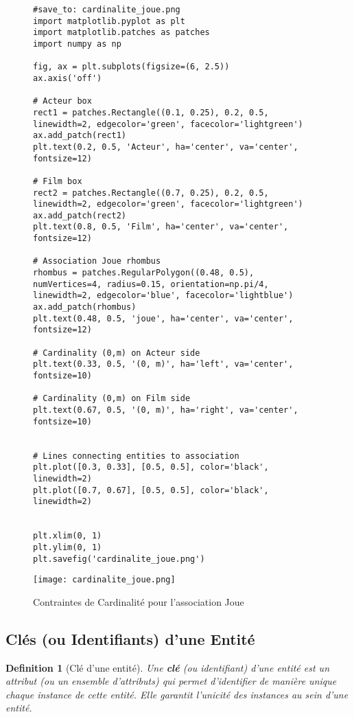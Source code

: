 \documentclass{article}
\newtheorem{definition}{Definition}
\begin{document}
\begin{figure}[H]
    \centering
    \begin{verbatim}
#save_to: cardinalite_joue.png
import matplotlib.pyplot as plt
import matplotlib.patches as patches
import numpy as np

fig, ax = plt.subplots(figsize=(6, 2.5))
ax.axis('off')

# Acteur box
rect1 = patches.Rectangle((0.1, 0.25), 0.2, 0.5, linewidth=2, edgecolor='green', facecolor='lightgreen')
ax.add_patch(rect1)
plt.text(0.2, 0.5, 'Acteur', ha='center', va='center', fontsize=12)

# Film box
rect2 = patches.Rectangle((0.7, 0.25), 0.2, 0.5, linewidth=2, edgecolor='green', facecolor='lightgreen')
ax.add_patch(rect2)
plt.text(0.8, 0.5, 'Film', ha='center', va='center', fontsize=12)

# Association Joue rhombus
rhombus = patches.RegularPolygon((0.48, 0.5), numVertices=4, radius=0.15, orientation=np.pi/4, linewidth=2, edgecolor='blue', facecolor='lightblue')
ax.add_patch(rhombus)
plt.text(0.48, 0.5, 'joue', ha='center', va='center', fontsize=12)

# Cardinality (0,m) on Acteur side
plt.text(0.33, 0.5, '(0, m)', ha='left', va='center', fontsize=10)

# Cardinality (0,m) on Film side
plt.text(0.67, 0.5, '(0, m)', ha='right', va='center', fontsize=10)


# Lines connecting entities to association
plt.plot([0.3, 0.33], [0.5, 0.5], color='black', linewidth=2)
plt.plot([0.7, 0.67], [0.5, 0.5], color='black', linewidth=2)


plt.xlim(0, 1)
plt.ylim(0, 1)
plt.savefig('cardinalite_joue.png')

        \end{verbatim}
        \texttt{[image: cardinalite\_joue.png]}
        \caption{Contraintes de Cardinalité pour l'association Joue}
        \label{fig:cardinalite_joue}
    \end{figure}

\subsection{Clés (ou Identifiants) d'une Entité}

\begin{definition}[Clé d'une entité]
    Une \textbf{clé} (ou identifiant) d'une entité est un attribut (ou un ensemble d'attributs) qui permet d'identifier de manière unique chaque instance de cette entité.  Elle garantit l'unicité des instances au sein d'une entité.
\end{definition}
\end{document}
